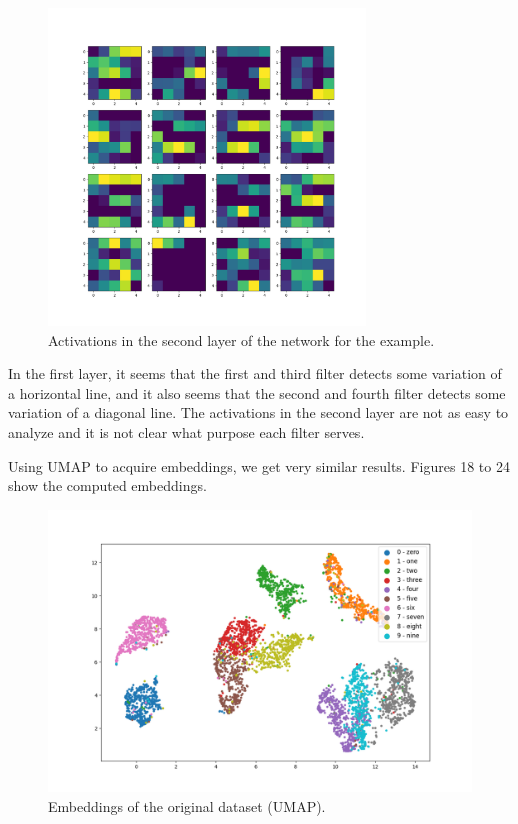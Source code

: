 \documentclass{article}
\begin{document}
\begin{figure}
  \centering
  \includegraphics[width=0.75\textwidth]{../../out/activations_cnn/mnist/t-sne/filter_outputs/class5_l2.png}
    \caption{Activations in the second layer of the network for the example.}
\end{figure}

In the first layer, it seems that the first and third filter detects some
variation of a horizontal line, and it also seems that the second and fourth
filter detects some variation of a diagonal line. The activations in the
second layer are not as easy to analyze and it is not clear what purpose each
filter serves.

Using UMAP to acquire embeddings, we get very similar results. Figures 18
to 24 show the computed embeddings.

\begin{figure}
  \centering
    \includegraphics[width=1.0\textwidth]{../../out/activations_cnn/mnist/umap/trained/plot_l0.png}
    \caption{Embeddings of the original dataset (UMAP).}
\end{figure}
\end{document}
